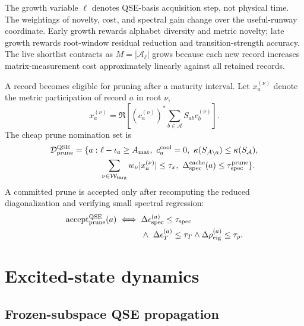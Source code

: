 \documentclass[
  reprint,
  amsmath,
  amssymb,
  aps,
  pra,
  nofootinbib,
  superscriptaddress,
  floatfix
]{revtex4-2}
\newcommand{\Acal}{\mathcal{A}}
\newcommand{\Wcal}{\mathcal{W}}
\newcommand{\Dcal}{\mathcal{D}}
\newcommand{\qse}{\mathrm{QSE}}
\begin{document}
The growth variable $\ell$ denotes QSE-basis acquisition step, not physical time.  The weightings of novelty, cost, and spectral gain change over the useful-runway coordinate.  Early growth rewards alphabet diversity and metric novelty; late growth rewards root-window residual reduction and transition-strength accuracy.  The live shortlist contracts as $M=|\Acal_\ell|$ grows because each new record increases matrix-measurement cost approximately linearly against all retained records.

A record becomes eligible for pruning after a maturity interval.  Let $x_a^{(\nu)}$ denote the metric participation of record $a$ in root $\nu$,
\begin{equation}
x_a^{(\nu)}
=
\Re\left[
(c_a^{(\nu)})^\ast
\sum_{b\in\Acal}S_{ab}c_b^{(\nu)}
\right].
\label{eq:qse_record_participation}
\end{equation}
The cheap prune nomination set is
\begin{equation}
\begin{aligned}
\Dcal_{\rm prune}^{\qse}
=\{a:\ &\ell-\iota_a\ge A_{\rm mat},\
c_a^{\rm cool}=0,\ \kappa(S_{\Acal\setminus a})\le \kappa(S_{\Acal}),\\
&\sum_{\nu\in\Wcal_{\rm targ}}w_\nu |x_a^{(\nu)}|\le\tau_x,\
\Delta_{\rm spec}^{\rm cache}(a)\le\tau_{\rm spec}^{\rm prune}\}.
\end{aligned}
\label{eq:qse_prune_candidates}
\end{equation}
A committed prune is accepted only after recomputing the reduced diagonalization and verifying small spectral regression:
\begin{equation}
\begin{aligned}
\operatorname{accept}_{\rm prune}^{\qse}(a)
\iff{}&
\Delta\epsilon_{\rm spec}^{(a)}\le\tau_{\rm spec}
\\
&\wedge\
\Delta\epsilon_T^{(a)}\le\tau_T
\wedge
\Delta\rho_{\rm eig}^{(a)}\le\tau_\rho .
\end{aligned}
\label{eq:qse_prune_accept}
\end{equation}

\section{Excited-state dynamics}
\label{sec:excited_dynamics_method}

\subsection{Frozen-subspace QSE propagation}
\end{document}
